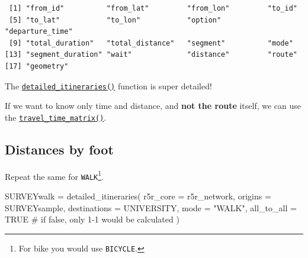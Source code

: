 \documentclass[
  letterpaper,
  DIV=11,
  numbers=noendperiod]{scrreprt}
\newenvironment{Shaded}{\begin{snugshade}}{\end{snugshade}}
\newcommand{\AttributeTok}[1]{\textcolor[rgb]{0.40,0.45,0.13}{#1}}
\newcommand{\CommentTok}[1]{\textcolor[rgb]{0.37,0.37,0.37}{#1}}
\newcommand{\ConstantTok}[1]{\textcolor[rgb]{0.56,0.35,0.01}{#1}}
\newcommand{\FunctionTok}[1]{\textcolor[rgb]{0.28,0.35,0.67}{#1}}
\newcommand{\NormalTok}[1]{\textcolor[rgb]{0.00,0.23,0.31}{#1}}
\newcommand{\OtherTok}[1]{\textcolor[rgb]{0.00,0.23,0.31}{#1}}
\newcommand{\StringTok}[1]{\textcolor[rgb]{0.13,0.47,0.30}{#1}}
\begin{document}
\begin{verbatim}
 [1] "from_id"          "from_lat"         "from_lon"         "to_id"           
 [5] "to_lat"           "to_lon"           "option"           "departure_time"  
 [9] "total_duration"   "total_distance"   "segment"          "mode"            
[13] "segment_duration" "wait"             "distance"         "route"           
[17] "geometry"        
\end{verbatim}

The
\href{https://ipeagit.github.io/r5r/reference/detailed_itineraries.html}{\texttt{detailed\_itineraries()}}
function is super detailed!

\begin{tcolorbox}[enhanced jigsaw, breakable, left=2mm, colframe=quarto-callout-note-color-frame, leftrule=.75mm, bottomrule=.15mm, arc=.35mm, rightrule=.15mm, colback=white, opacityback=0, toprule=.15mm]
\begin{minipage}[t]{5.5mm}
\textcolor{quarto-callout-note-color}{\faInfo}
\end{minipage}%
\begin{minipage}[t]{\textwidth - 5.5mm}

If we want to know only time and distance, and \textbf{not the route}
itself, we can use the
\href{https://ipeagit.github.io/r5r/reference/travel_time_matrix.html}{\texttt{travel\_time\_matrix()}}.

\end{minipage}%
\end{tcolorbox}

\subsection{Distances by foot}\label{distances-by-foot}

Repeat the same for \texttt{WALK}\footnote{For bike you would use
  \texttt{BICYCLE}.}.

\begin{Shaded}
\begin{Highlighting}[]
\NormalTok{SURVEYwalk }\OtherTok{=} \FunctionTok{detailed\_itineraries}\NormalTok{(}
  \AttributeTok{r5r\_core =}\NormalTok{ r5r\_network,}
  \AttributeTok{origins =}\NormalTok{ SURVEYsample,}
  \AttributeTok{destinations =}\NormalTok{ UNIVERSITY,}
  \AttributeTok{mode =} \StringTok{"WALK"}\NormalTok{,}
  \AttributeTok{all\_to\_all =} \ConstantTok{TRUE} \CommentTok{\# if false, only 1{-}1 would be calculated}
\NormalTok{)}
\end{Highlighting}
\end{Shaded}
\end{document}
